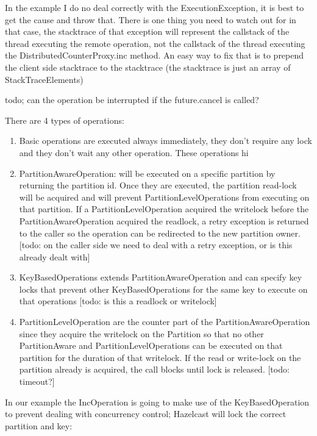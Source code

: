 In the example I do no deal correctly with the ExecutionException, it is best to get the cause and throw that. There is one thing you need to watch out for in that case, the stacktrace of that exception will represent the callstack of the thread executing the remote operation, not the callstack of the thread executing the DistributedCounterProxy.inc method. An easy way to fix that is to prepend the client side stacktrace to the stacktrace (the stacktrace is just an array of StackTraceElements)

todo; can the operation be interrupted if the future.cancel is called?

There are 4 types of operations:
\begin{enumerate}
\item Basic operations are executed always immediately, they don't require any lock and they don't wait any other operation. These operations hi
\item PartitionAwareOperation: will be executed on a specific partition by returning the partition id. Once they are executed, the partition read-lock will be acquired and will prevent PartitionLevelOperations from executing on that partition. If a PartitionLevelOperation acquired the writelock before the PartitionAwareOperation acquired the readlock, a retry exception is returned to the caller so the operation can be redirected to the new partition owner. [todo: on the caller side we need to deal with a retry exception, or is this already dealt with]
\item KeyBasedOperations extends PartitionAwareOperation and can specify key locks that prevent other KeyBasedOperations for the same key to execute on that operations [todo: is this a readlock or writelock]
\item PartitionLevelOperation are the counter part of the PartitionAwareOperation since they acquire the writelock on the Partition so that no other PartitionAware and PartitionLevelOperations can be executed on that partition for the duration of that writelock. If the read or write-lock on the partition already is acquired, the call blocks until lock is released. [todo: timeout?]
\end{enumerate}
In our example the IncOperation is going to make use of the KeyBasedOperation to prevent dealing with concurrency control; Hazelcast will lock the correct partition and key:
